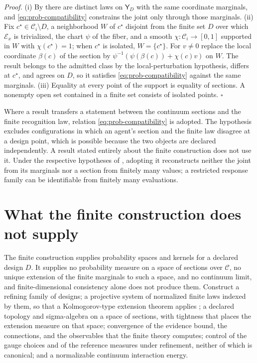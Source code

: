 \noindent\emph{Proof.}
(i) By  there are distinct laws on
\(\mathsf Y_D\) with the same coordinate marginals, and \eqref{eq:prob-compatibility} constrains the
joint only through those marginals. (ii) Fix \(c^\star\in\mathcal C_i\setminus D\), a neighborhood
\(W\) of \(c^\star\) disjoint from the finite set \(D\) over which \(\mathcal E_x\) is trivialized, the
chart \(\psi\) of the fiber, and a smooth \(\chi:\mathcal C_i\to[0,1]\) supported in \(W\) with
\(\chi(c^\star)=1\); when \(c^\star\) is isolated, \(W=\{c^\star\}\). For \(v\neq0\) replace the
local coordinate \(\beta(c)\) of the section by \(\psi^{-1}(\psi(\beta(c))+\chi(c)v)\) on \(W\). The
result belongs to the admitted class by the local-perturbation hypothesis, differs at
\(c^\star\), and agrees on \(D\), so it satisfies \eqref{eq:prob-compatibility} against the same
marginals. (iii) Equality at every point of
the support is equality of sections. A nonempty open set contained in a finite set consists of
isolated points. \hfill$\square$

Where a result transfers a statement between the continuum sections and the finite recognition law,
relation \eqref{eq:prob-compatibility} is adopted. The hypothesis excludes configurations in which an
agent's section and the finite law disagree at a design point, which is possible because the two
objects are declared independently. A result stated entirely about the finite construction does not
use it. Under the respective hypotheses of ,
adopting it reconstructs neither the joint from its marginals nor a section from finitely many
values; a restricted response family can be identifiable from finitely many evaluations.

\section{What the finite construction does not supply}
\label{sec:prob-continuum}

The finite construction supplies probability spaces and kernels for a declared design \(D\). It
supplies no probability measure on a space of sections over \(\mathcal C\), no unique extension of the
finite marginals to such a space, and no continuum limit, and finite-dimensional consistency alone
does not produce them. Construct a refining family of designs; a projective system of normalized
finite laws indexed by them, so that a Kolmogorov-type extension theorem applies
\citep{Kallenberg2021}; a declared topology and sigma-algebra on a space of sections, with tightness
that places the extension measure on that space; convergence of the evidence bound, the connections,
and the observables that the finite theory computes; control of the gauge choices and of the
reference measures under refinement, neither of which is canonical; and a normalizable continuum
interaction energy.

